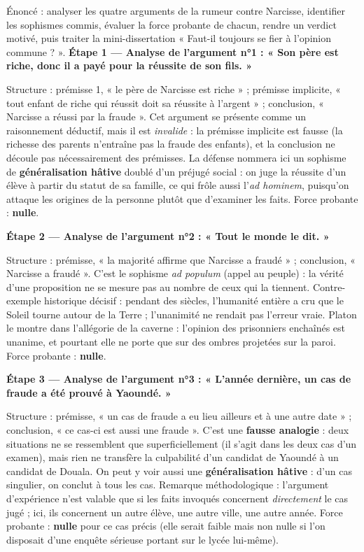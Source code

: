 \documentclass[11pt]{article}
\newcommand{\cle}[1]{{\popxbold\color{popdark}#1}}
\newcounter{popsec}
\newcounter{popsub}
\newcommand{\courssub}[1]{%
  \stepcounter{popsub}%
  \par\vspace{9pt}\noindent{\popxbold\fontsize{11.5}{13}\selectfont\color{popink}{\color{poporange}\thepopsec.\thepopsub}\hspace{6pt}#1}\par\nopagebreak\vspace{4pt}
}
\begin{document}
\courssub{Démarche et corrigé commenté}

\begin{exoresolu}
Énoncé : analyser les quatre arguments de la rumeur contre Narcisse, identifier les sophismes commis, évaluer la force probante de chacun, rendre un verdict motivé, puis traiter la mini-dissertation « Faut-il toujours se fier à l'opinion commune ? ».
\tcblower
\textbf{Étape 1 — Analyse de l'argument n°1 : « Son père est riche, donc il a payé pour la réussite de son fils. »}

Structure : prémisse 1, « le père de Narcisse est riche » ; prémisse implicite, « tout enfant de riche qui réussit doit sa réussite à l'argent » ; conclusion, « Narcisse a réussi par la fraude ». Cet argument se présente comme un raisonnement déductif, mais il est \emph{invalide} : la prémisse implicite est fausse (la richesse des parents n'entraîne pas la fraude des enfants), et la conclusion ne découle pas nécessairement des prémisses. La défense nommera ici un sophisme de \textbf{généralisation hâtive} doublé d'un préjugé social : on juge la réussite d'un élève à partir du statut de sa famille, ce qui frôle aussi l'\emph{ad hominem}, puisqu'on attaque les origines de la personne plutôt que d'examiner les faits. Force probante : \textbf{nulle}.

\textbf{Étape 2 — Analyse de l'argument n°2 : « Tout le monde le dit. »}

Structure : prémisse, « la majorité affirme que Narcisse a fraudé » ; conclusion, « Narcisse a fraudé ». C'est le sophisme \emph{\cle{ad populum}} (appel au peuple) : la vérité d'une proposition ne se mesure pas au nombre de ceux qui la tiennent. Contre-exemple historique décisif : pendant des siècles, l'humanité entière a cru que le Soleil tourne autour de la Terre ; l'unanimité ne rendait pas l'erreur vraie. Platon le montre dans l'allégorie de la caverne : l'opinion des prisonniers enchaînés est unanime, et pourtant elle ne porte que sur des ombres projetées sur la paroi. Force probante : \textbf{nulle}.

\textbf{Étape 3 — Analyse de l'argument n°3 : « L'année dernière, un cas de fraude a été prouvé à Yaoundé. »}

Structure : prémisse, « un cas de fraude a eu lieu ailleurs et à une autre date » ; conclusion, « ce cas-ci est aussi une fraude ». C'est une \textbf{fausse analogie} : deux situations ne se ressemblent que superficiellement (il s'agit dans les deux cas d'un examen), mais rien ne transfère la culpabilité d'un candidat de Yaoundé à un candidat de Douala. On peut y voir aussi une \textbf{généralisation hâtive} : d'un cas singulier, on conclut à tous les cas. Remarque méthodologique : l'argument d'expérience n'est valable que si les faits invoqués concernent \emph{directement} le cas jugé ; ici, ils concernent un autre élève, une autre ville, une autre année. Force probante : \textbf{nulle} pour ce cas précis (elle serait faible mais non nulle si l'on disposait d'une enquête sérieuse portant sur le lycée lui-même).


\end{exoresolu}
\end{document}
